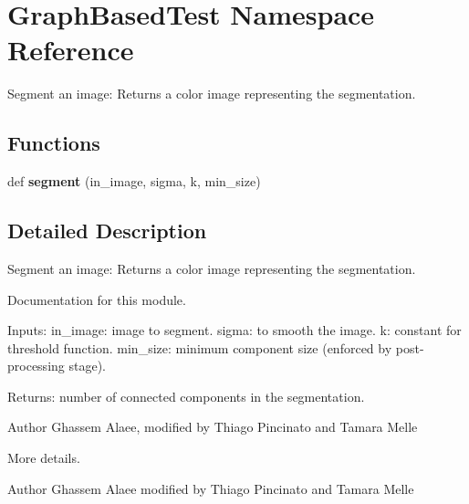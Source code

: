 \hypertarget{namespaceGraphBasedTest}{}\section{Graph\+Based\+Test Namespace Reference}
\label{namespaceGraphBasedTest}


Segment an image\+: Returns a color image representing the segmentation.  


\subsection*{Functions}
\begin{DoxyCompactItemize}
\item 
\mbox{\label{namespaceGraphBasedTest_a911856c0e5905ad9c077e9b6e9ad3436}} 
def {\bfseries segment} (in\+\_\+image, sigma, k, min\+\_\+size)
\end{DoxyCompactItemize}


\subsection{Detailed Description}
Segment an image\+: Returns a color image representing the segmentation. 

Documentation for this module.

Inputs\+: in\+\_\+image\+: image to segment. sigma\+: to smooth the image. k\+: constant for threshold function. min\+\_\+size\+: minimum component size (enforced by post-\/processing stage).

Returns\+: number of connected components in the segmentation. \begin{DoxyAuthor}{Author}
Ghassem Alaee, modified by Thiago Pincinato and Tamara Melle
\end{DoxyAuthor}
More details. \begin{DoxyAuthor}{Author}
Ghassem Alaee modified by Thiago Pincinato and Tamara Melle 
\end{DoxyAuthor}

